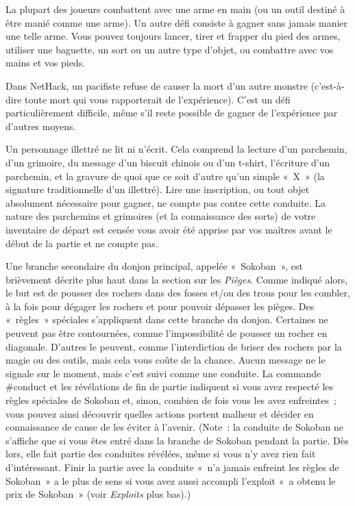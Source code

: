 \documentclass[titlepage]{article}
\begin{document}
La plupart des joueurs combattent avec une arme en main (ou un outil
destiné à être manié comme une arme).
Un autre défi consiste à gagner sans jamais manier une telle arme.
Vous pouvez toujours lancer, tirer et frapper du pied des armes, utiliser
une baguette, un sort ou un autre type d'objet, ou combattre avec vos
mains et vos pieds.


Dans NetHack, un pacifiste refuse de causer la mort d'un autre monstre
(c'est-à-dire toute mort qui vous rapporterait de l'expérience).
C'est un défi particulièrement difficile, même s'il reste possible de
gagner de l'expérience par d'autres moyens.


Un personnage illettré ne lit ni n'écrit.
Cela comprend la lecture d'un parchemin, d'un grimoire, du message d'un
biscuit chinois ou d'un t-shirt, l'écriture d'un parchemin, et la gravure
de quoi que ce soit d'autre qu'un simple «~X~» (la signature
traditionnelle d'un illettré).
Lire une inscription, ou tout objet absolument nécessaire pour gagner, ne
compte pas contre cette conduite.
La nature des parchemins et grimoires (et la connaissance des sorts) de
votre inventaire de départ est censée vous avoir été apprise par vos
maîtres avant le début de la partie et ne compte pas.


Une branche secondaire du donjon principal, appelée «~Sokoban~», est
brièvement décrite plus haut dans la section sur les \textit{Pièges}.
Comme indiqué alors, le but est de pousser des rochers dans des fosses
et/ou des trous pour les combler, à la fois pour dégager les rochers et
pour pouvoir dépasser les pièges.
Des «~règles~» spéciales s'appliquent dans cette branche du donjon.
Certaines ne peuvent pas être contournées, comme l'impossibilité de
pousser un rocher en diagonale.
D'autres le peuvent, comme l'interdiction de briser des rochers par la
magie ou des outils, mais cela vous coûte de la chance.
Aucun message ne le signale sur le moment, mais c'est suivi comme une
conduite.
La commande \#conduct et les révélations de fin de partie indiquent si vous
avez respecté les règles spéciales de Sokoban et, sinon, combien de fois
vous les avez enfreintes~; vous pouvez ainsi découvrir quelles actions
portent malheur et décider en connaissance de cause de les éviter à
l'avenir.
(Note~: la conduite de Sokoban ne s'affiche que si vous êtes entré dans la
branche de Sokoban pendant la partie.
Dès lors, elle fait partie des conduites révélées, même si vous n'y avez
rien fait d'intéressant.
Finir la partie avec la conduite «~n'a jamais enfreint les règles de
Sokoban~» a le plus de sens si vous avez aussi accompli l'exploit
«~a obtenu le prix de Sokoban~» (voir \textit{Exploits} plus bas).)
\end{document}
